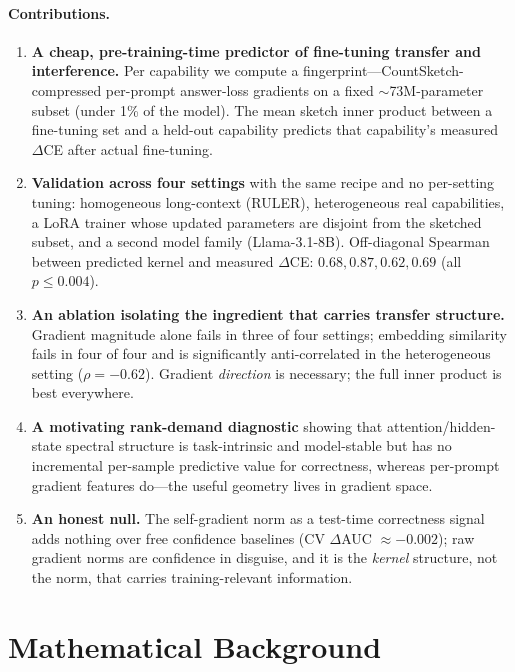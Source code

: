 \documentclass{article} %
\begin{document}
\paragraph{Contributions.}
\begin{enumerate}
  \item \textbf{A cheap, pre-training-time predictor of fine-tuning transfer and interference.}
    Per capability we compute a fingerprint---CountSketch-compressed per-prompt answer-loss
    gradients on a fixed $\sim$73M-parameter subset (under 1\% of the model). The mean sketch inner
    product between a fine-tuning set and a held-out capability predicts that capability's
    measured $\Delta$CE after actual fine-tuning.
  \item \textbf{Validation across four settings} with the same recipe and no per-setting tuning:
    homogeneous long-context (RULER), heterogeneous real capabilities, a LoRA trainer whose
    updated parameters are disjoint from the sketched subset, and a second model family
    (Llama-3.1-8B). Off-diagonal Spearman between predicted kernel and measured $\Delta$CE:
    $0.68, 0.87, 0.62, 0.69$ (all $p \le 0.004$).
  \item \textbf{An ablation isolating the ingredient that carries transfer structure.} Gradient
    magnitude alone fails in three of four settings; embedding similarity fails in four of four
    and is significantly anti-correlated in the heterogeneous setting ($\rho=-0.62$). Gradient
    \emph{direction} is necessary; the full inner product is best everywhere.
  \item \textbf{A motivating rank-demand diagnostic} showing that attention/hidden-state spectral
    structure is task-intrinsic and model-stable but has no incremental per-sample predictive
    value for correctness, whereas per-prompt gradient features do---the useful geometry lives in
    gradient space.
  \item \textbf{An honest null.} The self-gradient norm as a test-time correctness signal adds
    nothing over free confidence baselines (CV $\Delta$AUC $\approx -0.002$); raw gradient norms
    are confidence in disguise, and it is the \emph{kernel} structure, not the norm, that carries
    training-relevant information.
\end{enumerate}



\section{Mathematical Background}
\label{sec:background}
\end{document}
